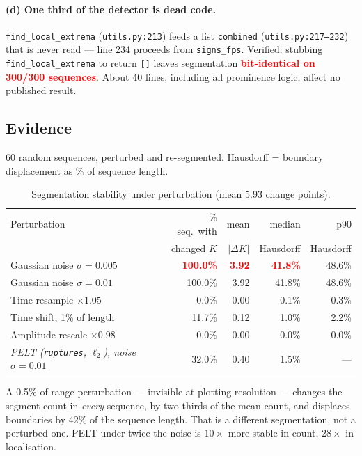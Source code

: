 \documentclass[11pt]{article}
\newcommand{\code}[1]{\texttt{\small #1}}
\newcommand{\finding}[1]{\textcolor{red}{\textbf{#1}}}
\begin{document}
\paragraph{(d) One third of the detector is dead code.} \code{find\_local\_extrema}
(\code{utils.py:213}) feeds a list \code{combined} (\code{utils.py:217--232}) that is never
read --- line 234 proceeds from \code{signs\_fps}. Verified: stubbing
\code{find\_local\_extrema} to return \code{[]} leaves segmentation \finding{bit-identical on
300/300 sequences}. About 40 lines, including all prominence logic, affect no published
result.

\subsection{Evidence}
60 random sequences, perturbed and re-segmented. Hausdorff = boundary displacement as \% of
sequence length.

\begin{table}[H]
\centering\small
\caption{Segmentation stability under perturbation (mean 5.93 change points).}
\begin{tabular}{lrrrr}
\toprule
Perturbation & \% seq.\ with & mean & median & p90 \\
             & changed $K$   & $|\Delta K|$ & Hausdorff & Hausdorff \\
\midrule
Gaussian noise $\sigma=0.005$ & \finding{100.0\%} & \finding{3.92} & \finding{41.8\%} & 48.6\% \\
Gaussian noise $\sigma=0.01$  & 100.0\% & 3.92 & 41.8\% & 48.6\% \\
Time resample $\times 1.05$   & 0.0\%   & 0.00 & 0.1\%  & 0.3\% \\
Time shift, 1\% of length     & 11.7\%  & 0.12 & 1.0\%  & 2.2\% \\
Amplitude rescale $\times0.98$& 0.0\%   & 0.00 & 0.0\%  & 0.0\% \\
\midrule
\emph{PELT (\code{ruptures}, $\ell_2$), noise $\sigma=0.01$} & 32.0\% & 0.40 & 1.5\% & --- \\
\bottomrule
\end{tabular}
\end{table}

\vspace{-0.5em}
A 0.5\%-of-range perturbation --- invisible at plotting resolution --- changes the segment
count in \emph{every} sequence, by two thirds of the mean count, and displaces boundaries by
42\% of the sequence length. That is a different segmentation, not a perturbed one. PELT
under twice the noise is $10\times$ more stable in count, $28\times$ in localisation.
\end{document}
